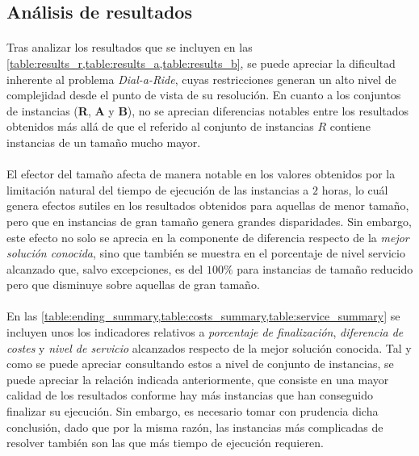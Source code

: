 \documentclass{subfiles}
\begin{document}
      \FloatBarrier
      \subsection{Análisis de resultados}
      \label{sec:results_analysis}

        \paragraph{}
        Tras analizar los resultados que se incluyen en las \cref{table:results_r,table:results_a,table:results_b}, se puede apreciar la dificultad inherente al problema \emph{Dial-a-Ride}, cuyas restricciones generan un alto nivel de complejidad desde el punto de vista de su resolución. En cuanto a los conjuntos de instancias (\textbf{R}, \textbf{A} y \textbf{B}), no se aprecian diferencias notables entre los resultados obtenidos más allá de que el referido al conjunto de instancias $R$ contiene instancias de un tamaño mucho mayor.

        \paragraph{}
        El efector del tamaño afecta de manera notable en los valores obtenidos por la limitación natural del tiempo de ejecución de las instancias a $2$ horas, lo cuál genera efectos sutiles en los resultados obtenidos para aquellas de menor tamaño, pero que en instancias de gran tamaño genera grandes disparidades. Sin embargo, este efecto no solo se aprecia en la componente de diferencia respecto de la \emph{mejor solución conocida}, sino que también se muestra en el porcentaje de nivel servicio alcanzado que, salvo excepciones, es del $100\%$ para instancias de tamaño reducido pero que disminuye sobre aquellas de gran tamaño.

        \paragraph{}
        En las \cref{table:ending_summary,table:costs_summary,table:service_summary} se incluyen unos los indicadores relativos a \emph{porcentaje de finalización}, \emph{diferencia de costes} y \emph{nivel de servicio} alcanzados respecto de la mejor solución conocida. Tal y como se puede apreciar consultando estos a nivel de conjunto de instancias, se puede apreciar la relación indicada anteriormente, que consiste en una mayor calidad de los resultados conforme hay más instancias que han conseguido finalizar su ejecución. Sin embargo, es necesario tomar con prudencia dicha conclusión, dado que por la misma razón, las instancias más complicadas de resolver también son las que más tiempo de ejecución requieren.
\end{document}
